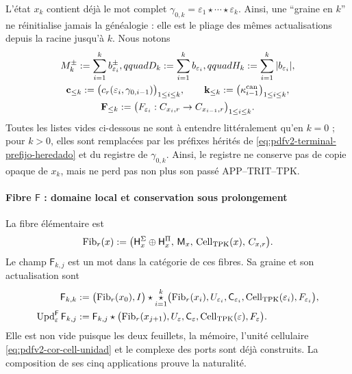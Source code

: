 L'état \(x_k\) contient déjà le mot complet \(\gamma_{0,k}=\varepsilon_1\star\cdots\star\varepsilon_k\). Ainsi, une ``graine en \(k\)'' ne réinitialise jamais la généalogie : elle est le pliage des mêmes actualisations depuis la racine jusqu'à \(k\). Nous notons
\begin{equation}
\label{eq:pdfv2-terminal-prefijo-heredado}
 \begin{gathered}
 M_k^\pm:=\sum_{i=1}^{k}b_{\varepsilon_i}^\pm,qquad
 D_k:=\sum_{i=1}^{k}b_{\varepsilon_i},qquad
 H_k:=\sum_{i=1}^{k}|b_{\varepsilon_i}|,\\
 \mathbf c_{\leq k}:=
  \bigl(c_r(\varepsilon_i,\gamma_{0,i-1})\bigr)_{1\leq i\leq k},
 \qquad
 \mathbf k_{\leq k}:=
  \bigl(\kappa_{i-1}^{\rm can}\bigr)_{1\leq i\leq k},\\
 \mathbf F_{\leq k}:=
  \bigl(F_{\varepsilon_i}:C_{x_i,r}\to C_{x_{i-1},r}\bigr)_{1\leq i\leq k}.
 \end{gathered}
\end{equation}
Toutes les listes vides ci-dessous ne sont à entendre littéralement qu'en \(k=0\) ; pour \(k>0\), elles sont remplacées par les préfixes hérités de \eqref{eq:pdfv2-terminal-prefijo-heredado} et du registre de \(\gamma_{0,k}\). Ainsi, le registre ne conserve pas de copie opaque de \(x_k\), mais ne perd pas non plus son passé APP--TRIT--TPK.

\paragraph{Fibre \(\mathsf F\) : domaine local et conservation sous prolongement}
La fibre élémentaire est
\begin{equation}
\label{eq:pdfv2-terminal-tipo-fibra}
 \operatorname{Fib}_r(x):=
 \bigl(\mathsf H_x^\Sigma\oplus\mathsf H_x^\Pi,\,
       \mathsf M_x,\,
       \operatorname{Cell}_{\rm TPK}(x),\,C_{x,r}\bigr).
\end{equation}
Le champ \(\mathsf F_{k,j}\) est un mot dans la catégorie de ces fibres. Sa graine et son actualisation sont
\begin{align}
 \mathsf F_{k,k}
 &:=\bigl(\operatorname{Fib}_r(x_0),I\bigr)\star
 \mathop{\star}_{i=1}^{k}
 \bigl(\operatorname{Fib}_r(x_i),U_{\varepsilon_i},
 \mathsf C_{\varepsilon_i},\operatorname{Cell}_{\rm TPK}(\varepsilon_i),
 F_{\varepsilon_i}\bigr),
 \label{eq:pdfv2-terminal-semilla-f}\\
 \operatorname{Upd}^{\mathsf F}_{\varepsilon}\mathsf F_{k,j}
 &:=
 \mathsf F_{k,j}\star
 \bigl(\operatorname{Fib}_r(x_{j+1}),U_\varepsilon,
 \mathsf C_\varepsilon,\operatorname{Cell}_{\rm TPK}(\varepsilon),
 F_\varepsilon\bigr).
 \label{eq:pdfv2-terminal-update-f}
\end{align}
Elle est non vide puisque les deux feuillets, la mémoire, l'unité cellulaire \eqref{eq:pdfv2-cor-cell-unidad} et le complexe des ports sont déjà construits. La composition de ses cinq applications prouve la naturalité.

